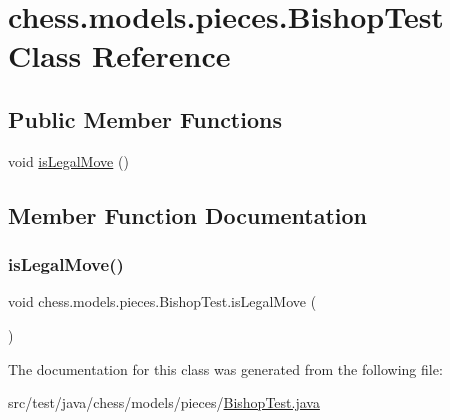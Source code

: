 \hypertarget{classchess_1_1models_1_1pieces_1_1_bishop_test}{}\section{chess.\+models.\+pieces.\+Bishop\+Test Class Reference}
\label{classchess_1_1models_1_1pieces_1_1_bishop_test}
\subsection*{Public Member Functions}
\begin{DoxyCompactItemize}
\item 
void \mbox{\hyperlink{classchess_1_1models_1_1pieces_1_1_bishop_test_a8da72169eb2ccd336e5a7a1535c246ac}{is\+Legal\+Move}} ()
\end{DoxyCompactItemize}


\subsection{Member Function Documentation}
\mbox{\label{classchess_1_1models_1_1pieces_1_1_bishop_test_a8da72169eb2ccd336e5a7a1535c246ac}} 
\subsubsection{\texorpdfstring{is\+Legal\+Move()}{isLegalMove()}}
{\footnotesize\ttfamily void chess.\+models.\+pieces.\+Bishop\+Test.\+is\+Legal\+Move (\begin{DoxyParamCaption}{ }\end{DoxyParamCaption})}



The documentation for this class was generated from the following file\+:\begin{DoxyCompactItemize}
\item 
src/test/java/chess/models/pieces/\mbox{\hyperlink{_bishop_test_8java}{Bishop\+Test.\+java}}\end{DoxyCompactItemize}
